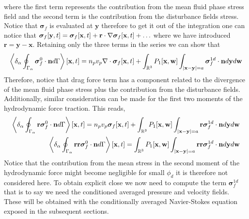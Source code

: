 where the first term represents the contribution from the mean fluid phase stress field and the second term is the contribution from the disturbance fields stress. 
Notice that $\bm\sigma_f$ is evaluated at $\textbf{y}$ therefore to get it out of the integration one can notice that $\bm\sigma_f[\textbf{y},t] = \bm\sigma_f[\textbf{x},t] + \textbf{r}\cdot \mathbf{\nabla}\bm\sigma_f[\textbf{x},t]+ \ldots$
where we have introduced $\textbf{r} = \textbf{y} - \textbf{x}$. 
Retaining only the three terms in the series we can show that 
\begin{equation}
    \left<\delta_\alpha \oint_{\Gamma_\alpha} \bm\sigma_f^0\cdot\textbf{n} d\Gamma\right>[\textbf{x},t]
    =
    n_p v_p 
    \mathbf{\nabla}\cdot\bm\sigma_f[\textbf{x},t]
    +
    \int_{\mathbb{R}^3}
    P_1[\textbf{x},\textbf{w}]
    \int_{|\textbf{x}-\textbf{y}|=a}
    \bm\sigma_f^{1d} \cdot \textbf{n}
    d\textbf{y}d\textbf{w}
    \label{eq:drag_final}
\end{equation}
Therefore, notice that drag force term has a component related to the divergence of the mean fluid phase stress plus the contribution from the disturbance fields. 
Additionally, similar consideration can be made for the first two moments of the hydrodynamic force traction. 
This reads,
\begin{align}
    \left<\delta_\alpha \oint_{\Gamma_\alpha} \textbf{r}\bm\sigma_f^0\cdot\textbf{n} d\Gamma\right>[\textbf{x},t]
    =
    n_p v_p \bm\sigma_f[\textbf{x},t]
    +
    \int_{\mathbb{R}^3}
    P_1[\textbf{x},\textbf{w}]
    \int_{|\textbf{x}-\textbf{y}|=a}
    \textbf{r}\bm\sigma_f^{1d} \cdot \textbf{n}
    d\textbf{y}
    d\textbf{w}
    \\
    \left<\delta_\alpha \oint_{\Gamma_\alpha} \textbf{rr}\bm\sigma_f^0\cdot\textbf{n} d\Gamma\right>[\textbf{x},t]
    =
    \int_{\mathbb{R}^3}
    P_1[\textbf{x},\textbf{w}]
    \int_{|\textbf{x}-\textbf{y}|=a}
    \textbf{rr}\bm\sigma_f^{1d} \cdot \textbf{n}
    d\textbf{y}
    d\textbf{w}
    \\
\end{align}
Notice that the contribution from the mean stress in the second moment of the hydrodynamic force might become negligible for small $\phi_d$ it is therefore not considered here. 
To obtain explicit close we now need to compute the term $\bm\sigma^{1d}_f$ that is to say we need the conditioned averaged pressure and velocity fields.  
These will be obtained with the conditionally averaged Navier-Stokes equation exposed in the subsequent sections. 

